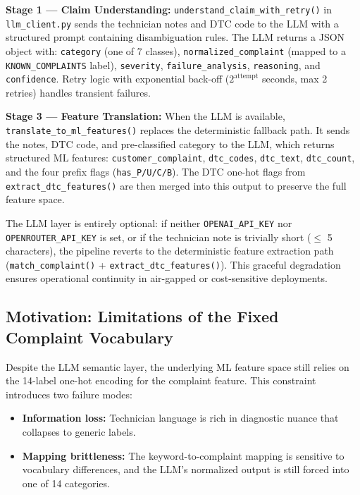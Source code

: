 \documentclass[10pt]{article}
\begin{document}
\textbf{Stage 1 --- Claim Understanding:} \texttt{understand\_claim\_with\_retry()} in \texttt{llm\_client.py} sends the technician notes and DTC code to the LLM with a structured prompt containing disambiguation rules. The LLM returns a JSON object with: \texttt{category} (one of 7 classes), \texttt{normalized\_complaint} (mapped to a \texttt{KNOWN\_COMPLAINTS} label), \texttt{severity}, \texttt{failure\_analysis}, \texttt{reasoning}, and \texttt{confidence}. Retry logic with exponential back-off ($2^{\text{attempt}}$ seconds, max 2 retries) handles transient failures.

\textbf{Stage 3 --- Feature Translation:} When the LLM is available, \texttt{translate\_to\_ml\_features()} replaces the deterministic fallback path. It sends the notes, DTC code, and pre-classified category to the LLM, which returns structured ML features: \texttt{customer\_complaint}, \texttt{dtc\_codes}, \texttt{dtc\_text}, \texttt{dtc\_count}, and the four prefix flags (\texttt{has\_P/U/C/B}). The DTC one-hot flags from \texttt{extract\_dtc\_features()} are then merged into this output to preserve the full feature space.

The LLM layer is entirely optional: if neither \texttt{OPENAI\_API\_KEY} nor \texttt{OPENROUTER\_API\_KEY} is set, or if the technician note is trivially short ($\leq$ 5 characters), the pipeline reverts to the deterministic feature extraction path (\texttt{match\_complaint()} + \texttt{extract\_dtc\_features()}). This graceful degradation ensures operational continuity in air-gapped or cost-sensitive deployments.

\subsection{Motivation: Limitations of the Fixed Complaint Vocabulary}

Despite the LLM semantic layer, the underlying ML feature space still relies on the 14-label one-hot encoding for the complaint feature. This constraint introduces two failure modes:

\begin{itemize}
    \item \textbf{Information loss:} Technician language is rich in diagnostic nuance that collapses to generic labels.
    \item \textbf{Mapping brittleness:} The keyword-to-complaint mapping is sensitive to vocabulary differences, and the LLM's normalized output is still forced into one of 14 categories.
\end{itemize}
\end{document}
